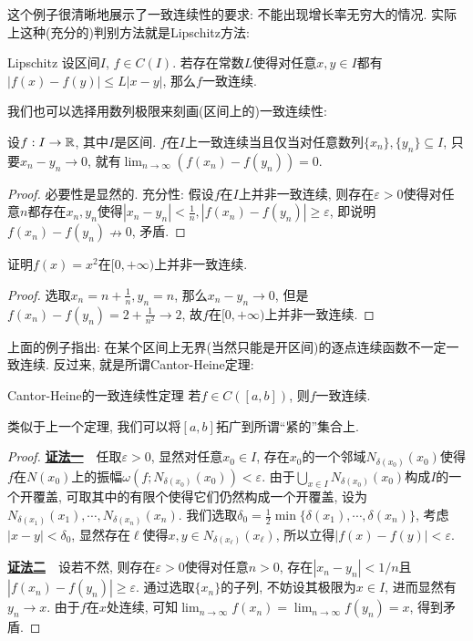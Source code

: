 这个例子很清晰地展示了一致连续性的要求: 不能出现增长率无穷大的情况. 实际上这种(充分的)判别方法就是Lipschitz方法: 

\begin{proposition}{Lipschitz}
	设区间$I$, $f \in C(I)$. 若存在常数$L$使得对任意$x,y \in I$都有$|f(x)-f(y)| \leq L|x-y|$, 那么$f$一致连续. 
\end{proposition}

我们也可以选择用数列极限来刻画(区间上的)一致连续性: 

\begin{proposition}{}
	设$f:I \to \mathbb{R}$, 其中$I$是区间. $f$在$I$上一致连续当且仅当对任意数列$\{ x_n \},\{ y_n \} \subseteq I$, 只要$x_n- y_n \to 0$, 就有$\lim_{n\to \infty} (f(x_n)-f(y_n))=0$. 
\end{proposition}
\begin{proof}
	必要性是显然的. 充分性: 假设$f$在$I$上并非一致连续, 则存在$\varepsilon >0$使得对任意$n$都存在$x_n,y_n$使得$|x_n-y_n|<\frac{1}{n}, |f(x_n)-f(y_n)| \geq \varepsilon$, 即说明$f(x_n) - f(y_n) \nrightarrow 0$, 矛盾. 
\end{proof}

\begin{example}
	证明$f(x)=x^2$在$[0,+\infty)$上并非一致连续. 
\end{example}
\begin{proof}
	选取$x_n=n+\frac{1}{n},y_n=n$, 那么$x_n-y_n \to 0$, 但是$f(x_n)-f(y_n)=2+\frac{1}{n^2} \to 2$, 故$f$在$[0,+\infty)$上并非一致连续. 
\end{proof}

上面的例子指出: 在某个区间上无界(当然只能是开区间)的逐点连续函数不一定一致连续. 反过来, 就是所谓Cantor-Heine定理: 

\begin{theorem}{Cantor-Heine的一致连续性定理}
	若$f \in C([a,b])$, 则$f$一致连续. 
\end{theorem}
\begin{remark}
	类似于上一个定理, 我们可以将$[a,b]$拓广到所谓“紧的”集合上. 
\end{remark}
\begin{proof}
	\underline{\textbf{证法一}}~~任取$\varepsilon >0$, 显然对任意$x_0 \in I$, 存在$x_0$的一个邻域$N_{\delta(x_0)}(x_0)$使得$f$在$N(x_0)$上的振幅$\omega (f;N_{\delta(x_0)}(x_0)) <\varepsilon$. 由于$\bigcup_{x \in I} N_{\delta(x_0)}(x_0)$构成$I$的一个开覆盖, 可取其中的有限个使得它们仍然构成一个开覆盖, 设为$N_{\delta (x_1)}(x_1), \cdots ,N_{\delta (x_n)}(x_n)$. 我们选取$\delta _0 = \frac{1}{2}\min \{ \delta (x_1),\cdots ,\delta (x_n) \}$, 考虑$|x-y|<\delta _0$, 显然存在$\ell$使得$x,y \in N_{\delta (x_{\ell})}(x_{\ell})$, 所以立得$|f(x)-f(y)|<\varepsilon$. 
	
	\underline{\textbf{证法二}}~~设若不然, 则存在$\varepsilon >0$使得对任意$n >0$, 存在$|x_n-y_n|<1/n$且$|f(x_n)-f(y_n)| \geq \varepsilon$. 通过选取$\{ x_n \}$的子列, 不妨设其极限为$x \in I$, 进而显然有$y_n \to x$. 由于$f$在$x$处连续, 可知$\lim_{n\to \infty} f(x_n) = \lim_{n\to \infty} f(y_n) = x$, 得到矛盾. 
\end{proof}

